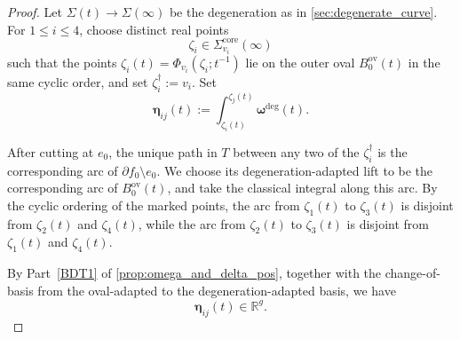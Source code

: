 \documentclass[12pt]{amsart}
\makeatletter
\numberwithin{equation}{section}
\newcommand{\itemrefperh@ps}[2]{\textup{#2}}
\newcommand{\itemref}[1]{\begingroup\let\perh@ps\itemrefperh@ps\ref{#1}\endgroup}
\theoremstyle{definition}
\newcommand{\R}{\mathbb{R}}
\def\trop{\dagger}
\def\ptSig{\zeta}
\def\mcurve{\Sigma}
\makeatother
\begin{document}
\begin{proof}

Let
$
\mcurve(t)\rightarrow\mcurve(\infty)
$
be the degeneration as in \cref{sec:degenerate_curve}. For $1\leq i\leq4$,
choose distinct real points
\[
\ptSig_i\in\mcurve_{v_i}^{\mathrm{core}}(\infty)
\]
such that the points
$
\ptSig_i(t)
=
\Phi_{v_i}(\ptSig_i;t^{-1})
$
lie on the outer oval $B_0^{\mathrm{ov}}(t)$ in the same cyclic order, and set
$
\ptSig_i^\trop:=v_i.
$
Set
\[
\bm \eta_{ij}(t)
:=
\int_{\ptSig_i(t)}^{\ptSig_j(t)}
\bm\omega^{\mathrm{deg}}(t).
\]

After cutting at $e_0$, the unique path in $T$ between any two of the
$\ptSig_i^\trop$ is the corresponding arc of
$\partial f_0\setminus e_0$. We choose its degeneration-adapted lift to
be the corresponding arc of $B_0^{\mathrm{ov}}(t)$, and take the
classical integral along this arc. By the cyclic ordering of the marked
points, the arc from $\ptSig_1(t)$ to $\ptSig_3(t)$ is disjoint from
$\ptSig_2(t)$ and $\ptSig_4(t)$, while the arc from $\ptSig_2(t)$ to
$\ptSig_3(t)$ is disjoint from $\ptSig_1(t)$ and $\ptSig_4(t)$.

By
Part~\itemref{BDT1} of \cref{prop:omega_and_delta_pos}, together with the
change-of-basis from the oval-adapted to the degeneration-adapted basis, we have
\[
\bm \eta_{ij}(t)\in\R^g.
\]


\end{proof}
\end{document}
